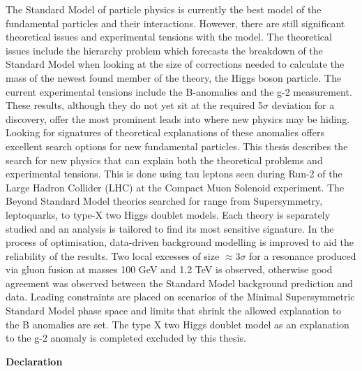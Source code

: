 \begin{titlepage}
\begin{adjustwidth}{1cm}{1cm}
The Standard Model of particle physics is currently the best model of the fundamental particles and their interactions. However, there are still significant theoretical issues and experimental tensions with the model. 
The theoretical issues include the hierarchy problem which forecasts the breakdown of the Standard Model when looking at the size of corrections needed to calculate the mass of the newest found member of the theory, the Higgs boson particle. 
The current experimental tensions include the B-anomalies and the g-2 measurement. 
These results, although they do not yet sit at the required 5$\sigma$ deviation for a discovery, offer the most prominent leads into where new physics may be hiding. Looking for signatures of theoretical explanations of these anomalies offers excellent search options for new fundamental particles. 
This thesis describes the search for new physics that can explain both the theoretical problems and experimental tensions. 
This is done using tau leptons seen during Run-2 of the Large Hadron Collider (LHC) at the Compact Muon Solenoid experiment. 
The Beyond Standard Model theories searched for range from Supersymmetry, leptoquarks, to type-X two Higgs doublet models. 
Each theory is separately studied and an analysis is tailored to find its most sensitive signature. 
In the process of optimisation, data-driven background modelling is improved to aid the reliability of the results. 
Two local excesses of size $\approx 3\sigma$ for a resonance produced via gluon fusion at masses 100 GeV and 1.2 TeV is observed, otherwise good agreement was observed between the Standard Model background prediction and data.
Leading constraints are placed on scenarios of the Minimal Supersymmetric Standard Model phase space and limits that shrink the allowed explanation to the B anomalies are set.
The type X two Higgs doublet model as an explanation to the g-2 anomaly is completed excluded by this thesis.
\end{adjustwidth}
\vspace*{\fill}
\newpage

\vspace*{\fill}
\begin{adjustwidth}{1cm}{1cm}
\begin{center}
\Large \textbf{Declaration}
\vspace{0.5cm}
\end{center}


\end{adjustwidth}
\end{titlepage}
